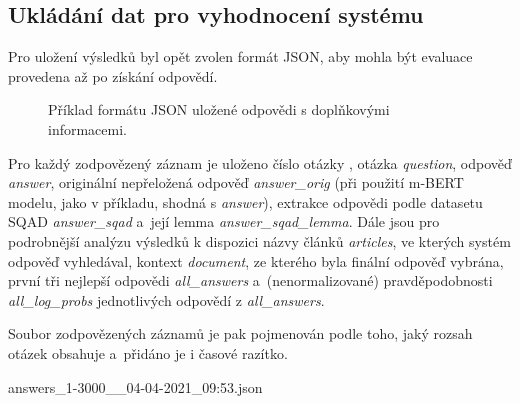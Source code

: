 \subsection{Ukládání dat pro vyhodnocení systému}
Pro uložení výsledků byl opět zvolen formát JSON, aby mohla být evaluace provedena až po získání odpovědí.\par
\begin{figure}[hbt]
	\centering
	\caption{Příklad formátu JSON uložené odpovědi s doplňkovými informacemi.}
	\label{fig:saved_answer}
\end{figure}
Pro každý zodpovězený záznam je uloženo číslo otázky , otázka \emph{question}, odpověď \emph{answer}, originální nepřeložená odpověď \emph{answer\_orig} (při použití m-BERT modelu, jako v příkladu, shodná s \emph{answer}), extrakce odpovědi podle datasetu SQAD \emph{answer\_sqad} a~její lemma \emph{answer\_sqad\_lemma}. Dále jsou pro podrobnější analýzu výsledků k dispozici názvy článků \emph{articles}, ve kterých systém odpověď vyhledával, kontext \emph{document}, ze kterého byla finální odpověď vybrána, první tři nejlepší odpovědi \emph{all\_answers} a~(nenormalizované) pravděpodobnosti \emph{all\_log\_probs} jednotlivých odpovědí z \emph{all\_answers}.\par
Soubor zodpovězených záznamů je pak pojmenován podle toho, jaký rozsah otázek obsahuje a~přidáno je i časové razítko.
\begin{center}
    answers\_1-3000\_\_04-04-2021\_09:53.json
\end{center}

